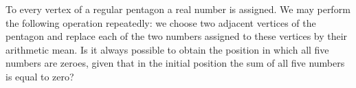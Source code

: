 To every vertex of a regular pentagon a real number is assigned. We may perform the following operation repeatedly: we choose two adjacent vertices of the pentagon and replace each of the two numbers assigned to these vertices by their arithmetic mean. Is it always possible to obtain the position in which all five numbers are zeroes, given that in the initial position the sum of all five numbers is equal to zero?
